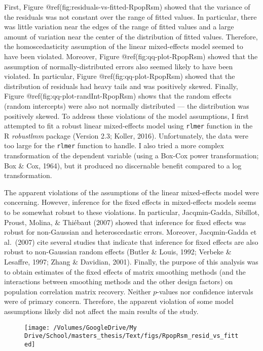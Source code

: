 \begin{appendix}
First, Figure @ref(fig:residuals-vs-fitted-RpopRsm) showed that the
variance of the residuals was not constant over the range of fitted
values. In particular, there was little variation near the edges of the
range of fitted values and a large amount of variation near the center
of the distribution of fitted values. Therefore, the homoscedasticity
assumption of the linear mixed-effects model seemed to have been
violated. Moreover, Figure @ref(fig:qq-plot-RpopRsm) showed that the
assumption of normally-distributed errors also seemed likely to have
been violated. In particular, Figure @ref(fig:qq-plot-RpopRsm) showed
that the distribution of residuals had heavy tails and was positively
skewed. Finally, Figure @ref(fig:qq-plot-randInt-RpopRsm) shows that the
random effects (random intercepts) were also not normally distributed
--- the distribution was positively skewed. To address these violations
of the model assumptions, I first attempted to fit a robust linear
mixed-effects model using \texttt{rlmer} function in the R
\emph{robustlmm} package (Version 2.3; Koller, 2016). Unfortunately, the
data were too large for the \texttt{rlmer} function to handle. I also
tried a more complex transformation of the dependent variable (using a
Box-Cox power transformation; Box \& Cox, 1964), but it produced no
discernable benefit compared to a log transformation.

The apparent violations of the assumptions of the linear mixed-effects
model were concerning. However, inference for the fixed effects in
mixed-effects models seems to be somewhat robust to these violations. In
particular, Jacqmin-Gadda, Sibillot, Proust, Molina, \& Thiébaut (2007)
showed that inference for fixed effects was robust for non-Gaussian and
heteroscedastic errors. Moreover, Jacqmin-Gadda et al.~(2007) cite
several studies that indicate that inference for fixed effects are also
robust to non-Gaussian random effects (Butler \& Louis, 1992; Verbeke \&
Lesaffre, 1997; Zhang \& Davidian, 2001). Finally, the purpose of this
analysis was to obtain estimates of the fixed effects of matrix
smoothing methods (and the interactions between smoothing methods and
the other design factors) on population correlation matrix recovery.
Neither \(p\)-values nor confidence intervals were of primary concern.
Therefore, the apparent violation of some model assumptions likely did
not affect the main results of the study.

\begin{figure}

{\centering \texttt{[image: /Volumes/GoogleDrive/My Drive/School/masters\_thesis/Text/figs/RpopRsm\_resid\_vs\_fitted]} 

}
\end{figure}
\end{appendix}
